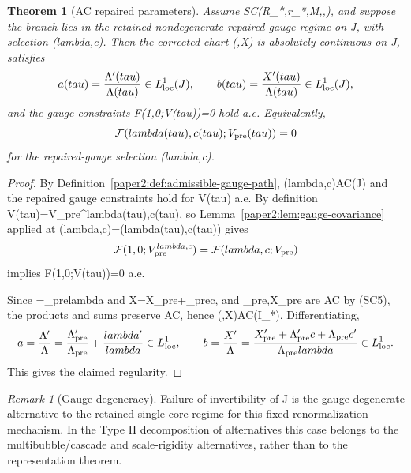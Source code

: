 \documentclass[11pt]{amsart}
\def\({}%
\def\){}%
\def\mathrm#1{#1}%
\def\tau{tau}%
\def\lambda{lambda}%
\theoremstyle{plain}
\newtheorem{theorem}{Theorem}[section]
\theoremstyle{definition}
\theoremstyle{remark}
\newtheorem{remark}[remark]{Remark}
\begin{document}
\begin{theorem}[AC repaired parameters]\label{paper2:thm:repaired-existence}
Assume \(\mathrm{SC}(R_*,r_*,M,\eta,\kappa)\), and suppose the branch lies in the
retained nondegenerate repaired-gauge regime on \(J\), with selection
\((\lambda,c)\). Then the corrected
chart \((\Lambda,X)\) is absolutely continuous on \(J\), satisfies
\[
a(\tau)=\frac{\Lambda'(\tau)}{\Lambda(\tau)}\in L^1_{\rm loc}(J),\qquad
b(\tau)=\frac{X'(\tau)}{\Lambda(\tau)}\in L^1_{\rm loc}(J),
\]
and the gauge constraints \(\mathcal F(1,0;V(\tau))=0\) hold a.e.
Equivalently,
\[
\mathcal F(\lambda(\tau),c(\tau);V_{\rm pre}(\tau))=0
\]
for the repaired-gauge selection \((\lambda,c)\).
\end{theorem}
\begin{proof}
By Definition~\ref{paper2:def:admissible-gauge-path}, \((\lambda,c)\in AC(J)\) and the
repaired gauge constraints hold for \(V(\tau)\) a.e.
By definition \(V(\tau)=V_{\rm pre}^{\lambda(\tau),c(\tau)}\), so Lemma~\ref{paper2:lem:gauge-covariance}
applied at \((\lambda,c)=(\lambda(\tau),c(\tau))\) gives
\[
\mathcal F(1,0;V_{\rm pre}^{\lambda,c})=\mathcal F(\lambda,c;V_{\rm pre})
\]
implies \(\mathcal F(1,0;V(\tau))=0\) a.e.

Since \(\Lambda=\Lambda_{\rm pre}\lambda\) and \(X=X_{\rm pre}+\Lambda_{\rm pre}c\),
and \(\Lambda_{\rm pre},X_{\rm pre}\) are AC by \textup{(SC5)}, the products and sums
preserve AC, hence \((\Lambda,X)\in AC(I_*)\). Differentiating,
\[
a=\frac{\Lambda'}{\Lambda}
=\frac{\Lambda_{\rm pre}'}{\Lambda_{\rm pre}}+\frac{\lambda'}{\lambda}\in L^1_{\rm loc},\qquad
b=\frac{X'}{\Lambda}
=\frac{X_{\rm pre}'+\Lambda_{\rm pre}'c+\Lambda_{\rm pre}c'}
{\Lambda_{\rm pre}\lambda}\in L^1_{\rm loc}.
\]
This gives the claimed regularity.
\end{proof}

\begin{remark}[Gauge degeneracy]
Failure of invertibility of \(J\) is the gauge-degenerate alternative to the
retained single-core regime for this fixed renormalization mechanism.  In the
Type II decomposition of alternatives this case belongs to the
multibubble/cascade and scale-rigidity alternatives, rather than to the
representation theorem.
\end{remark}
\end{document}
